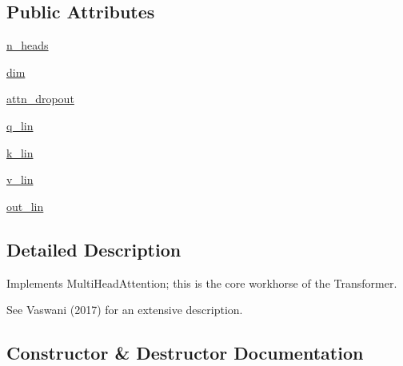 \subsection*{Public Attributes}
\begin{DoxyCompactItemize}
\item 
\hyperlink{classparlai_1_1agents_1_1transformer_1_1modules_1_1MultiHeadAttention_aa28ff3887a718bb96a9bd27c938a0baf}{n\+\_\+heads}
\item 
\hyperlink{classparlai_1_1agents_1_1transformer_1_1modules_1_1MultiHeadAttention_a0ffd2e0d89db2f682561af438aaa1eb5}{dim}
\item 
\hyperlink{classparlai_1_1agents_1_1transformer_1_1modules_1_1MultiHeadAttention_ac1c0169222b929c580d1a786479d7ed2}{attn\+\_\+dropout}
\item 
\hyperlink{classparlai_1_1agents_1_1transformer_1_1modules_1_1MultiHeadAttention_a84ab720bc232bb48e8f61e37e7c52323}{q\+\_\+lin}
\item 
\hyperlink{classparlai_1_1agents_1_1transformer_1_1modules_1_1MultiHeadAttention_a1e86cacd8fe8129222fe04c41c48655d}{k\+\_\+lin}
\item 
\hyperlink{classparlai_1_1agents_1_1transformer_1_1modules_1_1MultiHeadAttention_a1b1c33915c80f894221dfd4f0a0a2896}{v\+\_\+lin}
\item 
\hyperlink{classparlai_1_1agents_1_1transformer_1_1modules_1_1MultiHeadAttention_a495812bb583389a5f5dae989a22bda19}{out\+\_\+lin}
\end{DoxyCompactItemize}


\subsection{Detailed Description}
\begin{DoxyVerb}Implements MultiHeadAttention; this is the core workhorse of the Transformer.

See Vaswani (2017) for an extensive description.
\end{DoxyVerb}
 

\subsection{Constructor \& Destructor Documentation}
\mbox{\label{classparlai_1_1agents_1_1transformer_1_1modules_1_1MultiHeadAttention_a427b8cfaac6d37141555616d9cee8b74}} 
